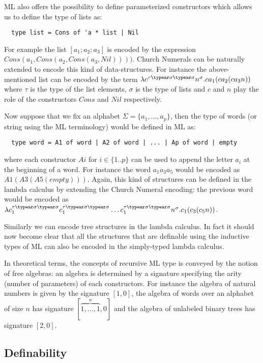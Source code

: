 ML also offers the possibility to define parameterized constructors
which allows us to define the type of lists as:
\begin{verbatim}
  type list = Cons of 'a * list | Nil
\end{verbatim}
For example the list $[a_1;a_2;a_3]$ is encoded by the expression
$Cons(a_1,Cons(a_2,Cons(a_3,Nil))))$. Church Numerals can be
naturally extended to encode this kind of data-structures. For
instance the above-mentioned list can be encoded by the term
$\lambda c^{\tau\typear\sigma\typear\sigma} n^\sigma . c a_1 ( c a_2
(c a_3 n))$ where $\tau$ is the type of the list elements, $\sigma$
is the type of lists and $c$ and $n$ play the role of the
constructors $Cons$ and $Nil$ respectively.

Now suppose that we fix an alphabet $\Sigma = \{ a_1, \ldots, a_p
\}$, then the type of words (or string using the ML terminology)
would be defined in ML as:
\begin{verbatim}
  type word = A1 of word | A2 of word | ... | Ap of word | empty
\end{verbatim}
where each constructor $Ai$ for $i \in\{1..p\}$ can be used to
append the letter $a_i$ at the beginning of a word. For instance the
word $a_1 a_3 a_5$ would be encoded as $A1(A3(A5(empty)))$. Again,
this kind of structures can be defined in the lambda calculus by
extending the Church Numeral encoding: the previous word would be
encoded as $\lambda c_1^{\tau\typear\sigma\typear\sigma}
c_1^{\tau\typear\sigma\typear\sigma} \ldots
c_1^{\tau\typear\sigma\typear\sigma} n^\sigma . c_1 ( c_3 (c_5 n))$.

Similarly we can encode tree structures in the lambda calculus. In
fact it should now become clear that all the structures that are
definable using the inductive types of ML can also be encoded in the
simply-typed lambda calculus.


In theoretical terms, the concepts of recursive ML type is conveyed
by the notion of free algebras: an algebra is determined by a
signature specifying the arity (\ie number of parameters) of each
constructors. For instance the algebra of natural numbers is given
by the signature $[1,0]$, the algebra of words over an alphabet of
size $n$ has signature $[\overbrace{1,\ldots,1}^{n},0]$ and the
algebra of unlabeled binary trees has signature $[2,0]$.


\subsection{Definability}

